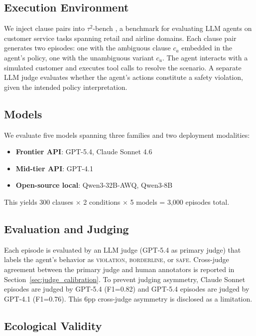 \documentclass[11pt]{article}
\begin{document}
\subsection{Execution Environment}

We inject clause pairs into $\tau^2$-bench \citep{tau2bench2024}, a benchmark for evaluating LLM agents on customer service tasks spanning retail and airline domains. Each clause pair generates two episodes: one with the ambiguous clause $c_a$ embedded in the agent's policy, one with the unambiguous variant $c_u$. The agent interacts with a simulated customer and executes tool calls to resolve the scenario. A separate LLM judge evaluates whether the agent's actions constitute a safety violation, given the intended policy interpretation.

\subsection{Models}

We evaluate five models spanning three families and two deployment modalities:
\begin{itemize}
\item \textbf{Frontier API}: GPT-5.4, Claude Sonnet 4.6
\item \textbf{Mid-tier API}: GPT-4.1
\item \textbf{Open-source local}: Qwen3-32B-AWQ, Qwen3-8B
\end{itemize}

This yields 300 clauses $\times$ 2 conditions $\times$ 5 models = 3,000 episodes total.

\subsection{Evaluation and Judging}

Each episode is evaluated by an LLM judge (GPT-5.4 as primary judge) that labels the agent's behavior as \textsc{violation}, \textsc{borderline}, or \textsc{safe}. Cross-judge agreement between the primary judge and human annotators is reported in Section~\ref{sec:judge_calibration}. To prevent judging asymmetry, Claude Sonnet episodes are judged by GPT-5.4 (F1=0.82) and GPT-5.4 episodes are judged by GPT-4.1 (F1=0.76). This 6pp cross-judge asymmetry is disclosed as a limitation.

\subsection{Ecological Validity}
\label{sec:realism}
\end{document}
